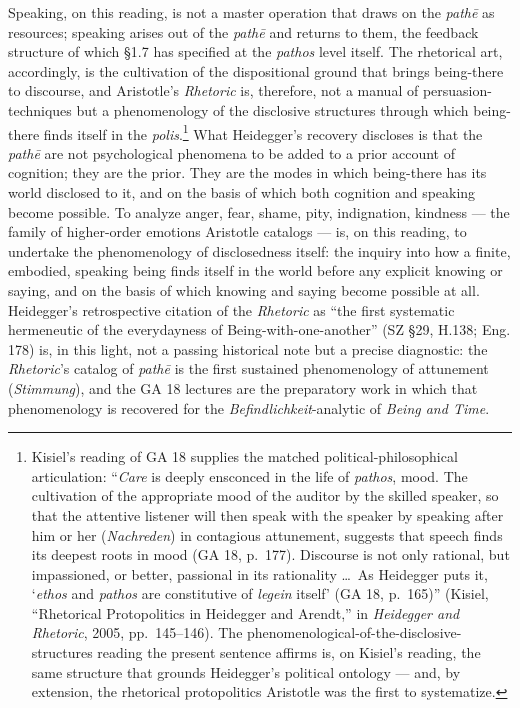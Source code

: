 \documentclass{article}
\begin{document}
Speaking, on this reading, is not a master operation that draws on the \textit{pathē} as resources; speaking arises out of the \textit{pathē} and returns to them, the feedback structure of which \S1.7 has specified at the \textit{pathos} level itself. The rhetorical art, accordingly, is the cultivation of the dispositional ground that brings being-there to discourse, and Aristotle's \textit{Rhetoric} is, therefore, not a manual of persuasion-techniques but a phenomenology of the disclosive structures through which being-there finds itself in the \textit{polis}.\footnote{Kisiel's reading of GA 18 supplies the matched political-philosophical articulation: ``\textit{Care} is deeply ensconced in the life of \textit{pathos}, mood. The cultivation of the appropriate mood of the auditor by the skilled speaker, so that the attentive listener will then speak with the speaker by speaking after him or her (\textit{Nachreden}) in contagious attunement, suggests that speech finds its deepest roots in mood (GA 18, p.~177). Discourse is not only rational, but impassioned, or better, passional in its rationality \ldots\ As Heidegger puts it, `\textit{ethos} and \textit{pathos} are constitutive of \textit{legein} itself' (GA 18, p.~165)'' (Kisiel, ``Rhetorical Protopolitics in Heidegger and Arendt,'' in \textit{Heidegger and Rhetoric}, 2005, pp.~145--146). The phenomenological-of-the-disclosive-structures reading the present sentence affirms is, on Kisiel's reading, the same structure that grounds Heidegger's political ontology --- and, by extension, the rhetorical protopolitics Aristotle was the first to systematize.} What Heidegger's recovery discloses is that the \textit{pathē} are not psychological phenomena to be added to a prior account of cognition; they are the prior. They are the modes in which being-there has its world disclosed to it, and on the basis of which both cognition and speaking become possible. To analyze anger, fear, shame, pity, indignation, kindness --- the family of higher-order emotions Aristotle catalogs --- is, on this reading, to undertake the phenomenology of disclosedness itself: the inquiry into how a finite, embodied, speaking being finds itself in the world before any explicit knowing or saying, and on the basis of which knowing and saying become possible at all. Heidegger's retrospective citation of the \textit{Rhetoric} as ``the first systematic hermeneutic of the everydayness of Being-with-one-another'' (SZ \S29, H.138; Eng. 178) is, in this light, not a passing historical note but a precise diagnostic: the \textit{Rhetoric}'s catalog of \textit{pathē} is the first sustained phenomenology of attunement (\textit{Stimmung}), and the GA 18 lectures are the preparatory work in which that phenomenology is recovered for the \textit{Befindlichkeit}-analytic of \textit{Being and Time}.
\end{document}
